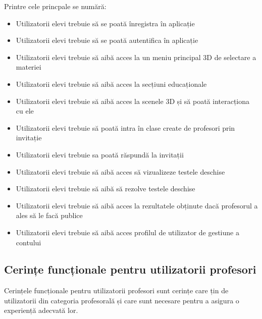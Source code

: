Printre cele princpale se numără:
\begin{itemize}
    \item Utilizatorii elevi trebuie să se poată înregistra în aplicație
    \item Utilizatorii elevi trebuie să se poată autentifica în aplicație
    \item Utilizatorii elevi trebuie să aibă acces la un meniu principal 3D de selectare a materiei
    \item Utilizatorii elevi trebuie să aibă acces la secțiuni educaționale
    \item Utilizatorii elevi trebuie să aibă acces la scenele 3D și să poată interacționa cu ele
    \item Utilizatorii elevi trebuie să poată intra în clase create de profesori prin invitație
    \item Utilizatorii elevi trebuie sa poată răspundă la invitații
    \item Utilizatorii elevi trebuie să aibă acces să vizualizeze testele deschise
    \item Utilizatorii elevi trebuie să aibă să rezolve testele deschise
    \item Utilizatorii elevi trebuie să aibă acces la rezultatele obținute dacă profesorul a ales să le facă publice
    \item Utilizatorii elevi trebuie să aibă acces profilul de utilizator de gestiune a contului
\end{itemize}

\subsection{Cerințe funcționale pentru utilizatorii profesori}
\label{sub-sec:proj-requirements-teachers}

Cerințele funcționale pentru utilizatorii profesori sunt cerințe care țin de utilizatorii din categoria profesorală
și care sunt necesare pentru a asigura o experiență adecvată lor.

